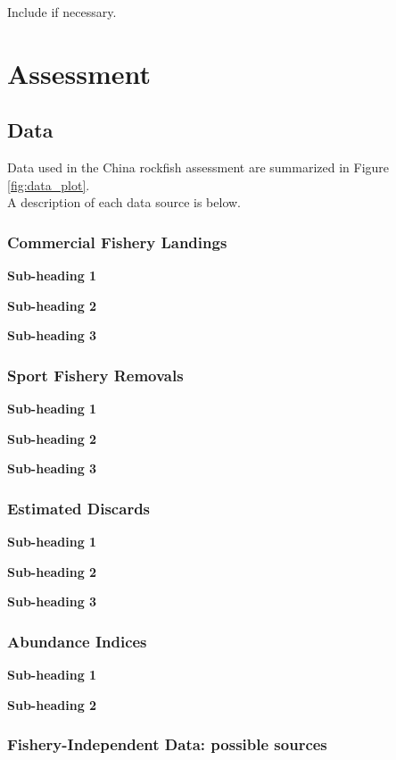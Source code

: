 \documentclass[12pt,]{article}
\begin{document}
Include if necessary.

\section{Assessment}\label{assessment}

\subsection{Data}\label{data}

Data used in the China rockfish assessment are summarized in Figure
\ref{fig:data_plot}.\\
A description of each data source is below.

\subsubsection{Commercial Fishery
Landings}\label{commercial-fishery-landings}

\textbf{Sub-heading 1}

\textbf{Sub-heading 2}

\textbf{Sub-heading 3}

\subsubsection{Sport Fishery Removals}\label{sport-fishery-removals}

\textbf{Sub-heading 1}

\textbf{Sub-heading 2}

\textbf{Sub-heading 3}

\subsubsection{Estimated Discards}\label{estimated-discards}

\textbf{Sub-heading 1}

\textbf{Sub-heading 2}

\textbf{Sub-heading 3}

\subsubsection{Abundance Indices}\label{abundance-indices}

\textbf{Sub-heading 1}

\textbf{Sub-heading 2}

\subsubsection{Fishery-Independent Data: possible
sources}\label{fishery-independent-data-possible-sources}
\end{document}
